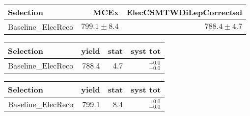 




\begin{tabular}{lrr}
\toprule
                 Selection  &                   MCEx  &          ElecCSMTWDiLepCorrected  \\ 
\midrule
        Baseline\_ElecReco &           $799.1\pm8.4$&                     $788.4\pm4.7$ \\ 
\bottomrule 
\end{tabular}









\begin{tabular}{l|rrr}
\toprule
            Selection & yield & stat & syst tot   \\ 
\midrule
   Baseline\_ElecReco & 788.4 & 4.7 & ${}^{+0.0}_{-0.0}$ \\
\bottomrule
\end{tabular}



\begin{tabular}{l|rrr}
\toprule
            Selection & yield & stat & syst tot   \\ 
\midrule
   Baseline\_ElecReco & 799.1 & 8.4 & ${}^{+0.0}_{-0.0}$ \\
\bottomrule
\end{tabular}
